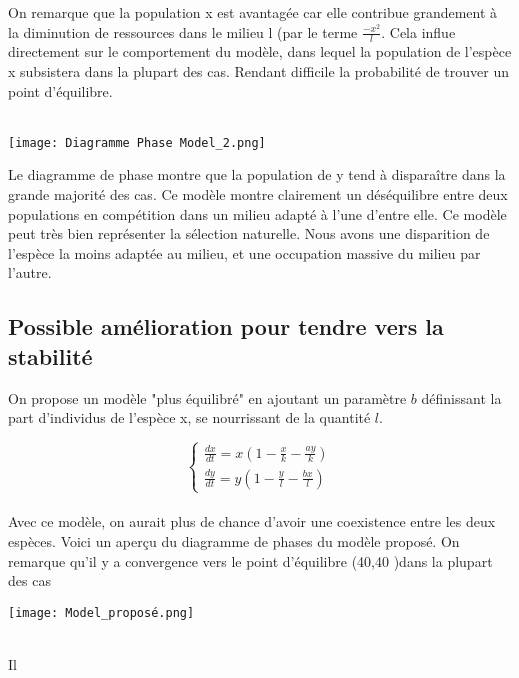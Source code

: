 \documentclass{article}
\begin{document}
On remarque que la population x est avantagée car elle contribue grandement à la diminution de ressources dans le milieu l (par le terme $\frac{-x^2}{l}$. Cela influe directement sur le comportement du modèle, dans lequel la population de l'espèce x subsistera dans la plupart des cas. Rendant difficile la probabilité de trouver un point d'équilibre. \\\\

\begin{center}
    \texttt{[image: Diagramme Phase Model\_2.png]}
\end{center}
Le diagramme de phase montre que la population de y tend à disparaître dans la grande majorité des cas. Ce modèle montre clairement un déséquilibre entre deux populations en compétition dans un milieu adapté à l'une d'entre elle. Ce modèle peut très bien représenter la sélection naturelle. Nous avons une disparition de l'espèce la moins adaptée au milieu, et une occupation massive du milieu par l'autre.

\subsection{Possible amélioration pour tendre vers la stabilité}
On propose un modèle "plus équilibré" en ajoutant un paramètre $b$ définissant la part d'individus de l'espèce x, se nourrissant de la quantité $l$.

\begin{equation*}
\left\{
\begin{array}{ll}
    \frac{dx}{dt} =  x(1 - \frac{x}{k} - \frac{a y}{k}) \\
    \frac{dy}{dt} = y(1- \frac{y}{l} - \frac{b x}{l})
\end{array}
\right.
\end{equation*}\\
\noindent
Avec ce modèle, on aurait plus de chance d'avoir une coexistence entre les deux espèces. Voici un aperçu du diagramme de phases du modèle proposé. On remarque qu'il y a convergence vers le point d'équilibre (40,40 )dans la plupart des cas\\
\begin{center}
    \texttt{[image: Model\_proposé.png]}
\end{center}\\
Il 

\newpage
\setcounter{secnumdepth}{0}
\end{document}
